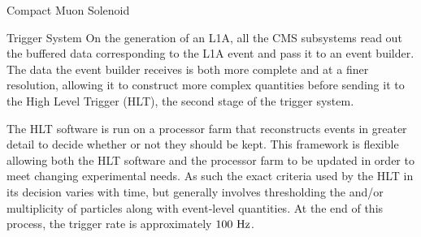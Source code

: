 \begin{section}{Compact Muon Solenoid}
\begin{subsection}{Trigger System}
On the generation of an L1A, all the CMS subsystems read out the buffered data corresponding to the L1A event and pass it to an event builder.
The data the event builder receives is both more complete and at a finer resolution, allowing it to construct more complex quantities before sending it to the High Level Trigger (HLT), the second stage of the trigger system.

The HLT software is run on a processor farm that reconstructs events in greater detail to decide whether or not they should be kept.
This framework is flexible allowing both the HLT software and the processor farm to be updated in order to meet changing experimental needs.
As such the exact criteria used by the HLT in its decision varies with time, but generally involves thresholding the \pT and/or multiplicity of particles along with event-level quantities.
At the end of this process, the trigger rate is approximately $100~\mathrm{Hz}$.

\end{subsection}

\end{section}

